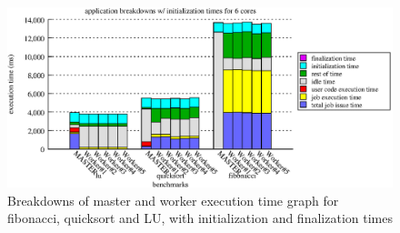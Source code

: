 \begin{figure}[!ht]
\includegraphics[width=\columnwidth]{figures/app_breakdowns_w_init}
\caption{Breakdowns of master and worker execution time graph for fibonacci, quicksort and LU, with initialization
and finalization times}
\label{fig:app_breakdowns_w_init}
\end{figure}



